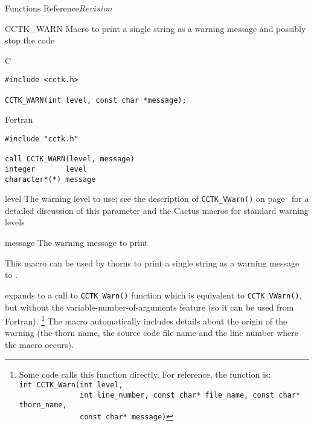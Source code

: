 \begin{cactuspart}{ Functions Reference}{}{$Revision$}





\begin{FunctionDescription}{CCTK\_WARN}
\label{CCTK-WARN}
Macro to print a single string as a warning message and possibly stop the code

\begin{SynopsisSection}
\begin{Synopsis}{C}
\begin{verbatim}
#include <cctk.h>

CCTK_WARN(int level, const char *message);
\end{verbatim}
\end{Synopsis}
\begin{Synopsis}{Fortran}
\begin{verbatim}
#include "cctk.h"

call CCTK_WARN(level, message)
integer       level
character*(*) message
\end{verbatim}
\end{Synopsis}
\end{SynopsisSection}

\begin{ParameterSection}
\begin{Parameter}{level}
The warning level to use;
see the description of \verb|CCTK_VWarn()| on page~\pageref{CCTK-VInfo}
for a detailed discussion of this parameter and the Cactus macros
for standard warning levels
\end{Parameter}
\begin{Parameter}{message}
The warning message to print
\end{Parameter}
\end{ParameterSection}

\begin{Discussion}
This macro can be used by thorns to print a single string as a warning message
to .

 expands to a call to \verb|CCTK_Warn()| 
function which is equivalent to \verb|CCTK_VWarn()|, but without the
variable-number-of-arguments feature (so it can be used from Fortran).%
\footnote{%
         Some code calls this function directly.
         For reference, the function is:\\
         \texttt{\mbox{}int CCTK\_Warn(int level,}\\
         \texttt{\mbox{}~~~~~~~~~~~~~~int line\_number, const char* file\_name, const char* thorn\_name,}\\
         \texttt{\mbox{}~~~~~~~~~~~~~~const char* message)}
         }%
{}  The macro automatically includes details about the origin of the warning
(the thorn name, the source code file name and the line number where the macro
occurs).


\end{Discussion}
\end{FunctionDescription}
\end{cactuspart}
